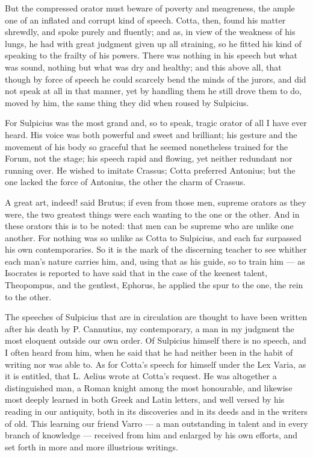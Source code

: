  But the compressed orator must beware of poverty and meagreness, the ample one of an inflated and corrupt kind of speech. Cotta, then, found his matter shrewdly, and spoke purely and fluently; and as, in view of the weakness of his lungs, he had with great judgment given up all straining, so he fitted his kind of speaking to the frailty of his powers. There was nothing in his speech but what was sound, nothing but what was dry and healthy; and this above all, that though by force of speech he could scarcely bend the minds of the jurors, and did not speak at all in that manner, yet by handling them he still drove them to do, moved by him, the same thing they did when roused by Sulpicius.

 For Sulpicius was the most grand and, so to speak, tragic orator of all I have ever heard. His voice was both powerful and sweet and brilliant; his gesture and the movement of his body so graceful that he seemed nonetheless trained for the Forum, not the stage; his speech rapid and flowing, yet neither redundant nor running over. He wished to imitate Crassus; Cotta preferred Antonius; but the one lacked the force of Antonius, the other the charm of Crassus.

 A great art, indeed! said Brutus; if even from those men, supreme orators as they were, the two greatest things were each wanting to the one or the other. And in these orators this is to be noted: that men can be supreme who are unlike one another. For nothing was so unlike as Cotta to Sulpicius, and each far surpassed his own contemporaries. So it is the mark of the discerning teacher to see whither each man's nature carries him, and, using that as his guide, so to train him — as Isocrates is reported to have said that in the case of the keenest talent, Theopompus, and the gentlest, Ephorus, he applied the spur to the one, the rein to the other.

 The speeches of Sulpicius that are in circulation are thought to have been written after his death by P. Cannutius, my contemporary, a man in my judgment the most eloquent outside our own order. Of Sulpicius himself there is no speech, and I often heard from him, when he said that he had neither been in the habit of writing nor was able to. As for Cotta's speech for himself under the Lex Varia, as it is entitled, that L. Aelius wrote at Cotta's request. He was altogether a distinguished man, a Roman knight among the most honourable, and likewise most deeply learned in both Greek and Latin letters, and well versed by his reading in our antiquity, both in its discoveries and in its deeds and in the writers of old. This learning our friend Varro — a man outstanding in talent and in every branch of knowledge — received from him and enlarged by his own efforts, and set forth in more and more illustrious writings.

